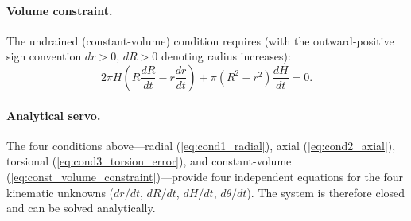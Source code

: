 \paragraph{Volume constraint.}
The undrained (constant-volume) condition requires (with the outward-positive sign convention $dr>0$, $dR>0$ denoting radius increases):
\begin{equation}
2\pi H\!\left(R\frac{dR}{dt} - r\frac{dr}{dt}\right) + \pi\!\left(R^2-r^2\right)\frac{dH}{dt} = 0.
\label{eq:const_volume_constraint}
\end{equation}

\paragraph{Analytical servo.}
The four conditions above---radial (\cref{eq:cond1_radial}), axial (\cref{eq:cond2_axial}), torsional (\cref{eq:cond3_torsion_error}), and constant-volume (\cref{eq:const_volume_constraint})---provide four independent equations for the four kinematic unknowns ($dr/dt$, $dR/dt$, $dH/dt$, $d\theta/dt$). The system is therefore closed and can be solved analytically.

